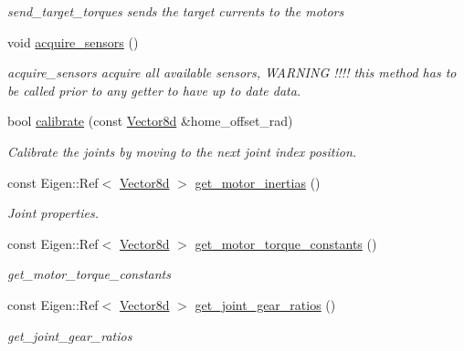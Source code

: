\begin{DoxyCompactItemize}
\begin{DoxyCompactList}\small\item\em send\+\_\+target\+\_\+torques sends the target currents to the motors \end{DoxyCompactList}\item 
void \hyperlink{classblmc__robots_1_1Solo8TI_a9241d0a805efd871a56d7cace099c208}{acquire\+\_\+sensors} ()
\begin{DoxyCompactList}\small\item\em acquire\+\_\+sensors acquire all available sensors, W\+A\+R\+N\+I\+NG !!!! this method has to be called prior to any getter to have up to date data. \end{DoxyCompactList}\item 
bool \hyperlink{classblmc__robots_1_1Solo8TI_a8ff4ec509f904ab3fab7268c75065c1f}{calibrate} (const \hyperlink{common__header_8hpp_a98975ffbe0bca1296078e0350dfedd60}{Vector8d} \&home\+\_\+offset\+\_\+rad)
\begin{DoxyCompactList}\small\item\em Calibrate the joints by moving to the next joint index position. \end{DoxyCompactList}\item 
const Eigen\+::\+Ref$<$ \hyperlink{common__header_8hpp_a98975ffbe0bca1296078e0350dfedd60}{Vector8d} $>$ \hyperlink{classblmc__robots_1_1Solo8TI_a21b4faac39d48f464cd29aea1c2eb9e2}{get\+\_\+motor\+\_\+inertias} ()
\begin{DoxyCompactList}\small\item\em Joint properties. \end{DoxyCompactList}\item 
const Eigen\+::\+Ref$<$ \hyperlink{common__header_8hpp_a98975ffbe0bca1296078e0350dfedd60}{Vector8d} $>$ \hyperlink{classblmc__robots_1_1Solo8TI_af421f0fa29744714c5e4a592501b972f}{get\+\_\+motor\+\_\+torque\+\_\+constants} ()
\begin{DoxyCompactList}\small\item\em get\+\_\+motor\+\_\+torque\+\_\+constants \end{DoxyCompactList}\item 
const Eigen\+::\+Ref$<$ \hyperlink{common__header_8hpp_a98975ffbe0bca1296078e0350dfedd60}{Vector8d} $>$ \hyperlink{classblmc__robots_1_1Solo8TI_a9f8c700d0646d5cc7f7e884b17aef1ab}{get\+\_\+joint\+\_\+gear\+\_\+ratios} ()
\begin{DoxyCompactList}\small\item\em get\+\_\+joint\+\_\+gear\+\_\+ratios \end{DoxyCompactList}\item 

\end{DoxyCompactItemize}
